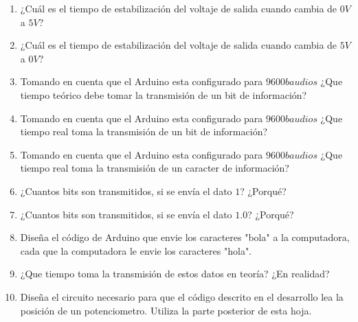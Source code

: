 	\begin{enumerate}
		\item ¿Cuál es el tiempo de estabilización del voltaje de salida cuando cambia de $0V$ a $5V$? \\ \vspace{0.9cm}

		\item ¿Cuál es el tiempo de estabilización del voltaje de salida cuando cambia de $5V$ a $0V$? \\ \vspace{0.9cm}

		\item Tomando en cuenta que el Arduino esta configurado para $9600 baudios$ ¿Que tiempo teórico debe tomar la transmisión de un bit de información? \\ \vspace{0.9cm}

		\item Tomando en cuenta que el Arduino esta configurado para $9600 baudios$ ¿Que tiempo real toma la transmisión de un bit de información? \\ \vspace{0.9cm}

		\item Tomando en cuenta que el Arduino esta configurado para $9600 baudios$ ¿Que tiempo real toma la transmisión de un caracter de información? \\ \vspace{0.9cm}

		\item ¿Cuantos bits son transmitidos, si se envía el dato $1$? ¿Porqué? \\ \vspace{0.9cm}

		\item ¿Cuantos bits son transmitidos, si se envía el dato $1.0$? ¿Porqué? \\ \vspace{0.9cm}

		\item Diseña el código de Arduino que envie los caracteres "bola" a la computadora, cada que la computadora le envie los caracteres "hola".

		\item ¿Que tiempo toma la transmisión de estos datos en teoría? ¿En realidad? \\ \vspace{0.9cm}

		\item Diseña el circuito necesario para que el código descrito en el desarrollo lea la posición de un potenciometro. Utiliza la parte posterior de esta hoja.


\end{enumerate}
